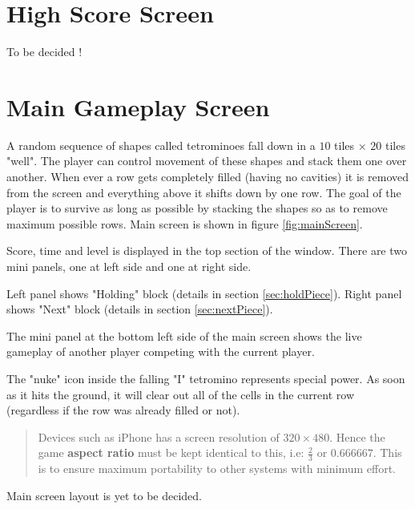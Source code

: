 \documentclass[10pt]{report}
\theoremstyle{definition}
\theoremstyle{remark}
\begin{document}
\section{High Score Screen}
To be decided !


\section{Main Gameplay Screen}
A random sequence of shapes called tetrominoes fall down in a $10$ tiles $\times$ $20$ tiles "well". The player can control movement of these shapes and stack them one over another. When ever a row gets completely filled (having no cavities) it is removed from the screen and everything above it shifts down by one row. The goal of the player is to survive as long as possible by stacking the shapes so as to remove maximum possible rows. Main screen is shown in figure \ref{fig:mainScreen}.

Score, time and level is displayed in the top section of the window. There are two mini panels, one at left side and one at right side.

Left panel shows "Holding" block (details in section \ref{sec:holdPiece}). Right panel shows "Next" block (details in section \ref{sec:nextPiece}).

The mini panel at the bottom left side of the main screen shows the live gameplay of another player competing with the current player.

The "nuke" icon inside the falling "I" tetromino represents special power. As soon as it hits the ground, it will clear out all of the cells in the current row (regardless if the row was already filled or not).


\begin{quote}
Devices such as iPhone has a screen resolution of $320\times480$. Hence the game \textbf{aspect ratio} must be kept identical to this, i.e: $\frac{2}{3}$ or $0.666667$. This is to ensure maximum portability to other systems with minimum effort.
\end{quote}

Main screen layout is yet to be decided.
\end{document}
